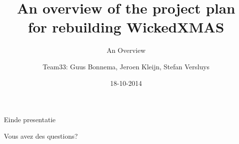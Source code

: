 \documentclass[10pt]{beamer}
\title[Plan]{An overview of the project plan\\ for rebuilding WickedXMAS}
\subtitle[Overview]{An Overview}
\author[Team33]{Team33: Guus Bonnema, Jeroen Kleijn, Stefan Versluys}
\date{18-10-2014}
\institute[OU nl]{Open University The Netherlands}
\begin{document}
\newcommand{\xmas}{x\textsc{mas}}%
\newcommand{\ok}{$\checkmark$}


\frame{\maketitle}   %





\begin{frame}{Einde presentatie}

Vous avez des questions?

\end{frame}
\end{document}
